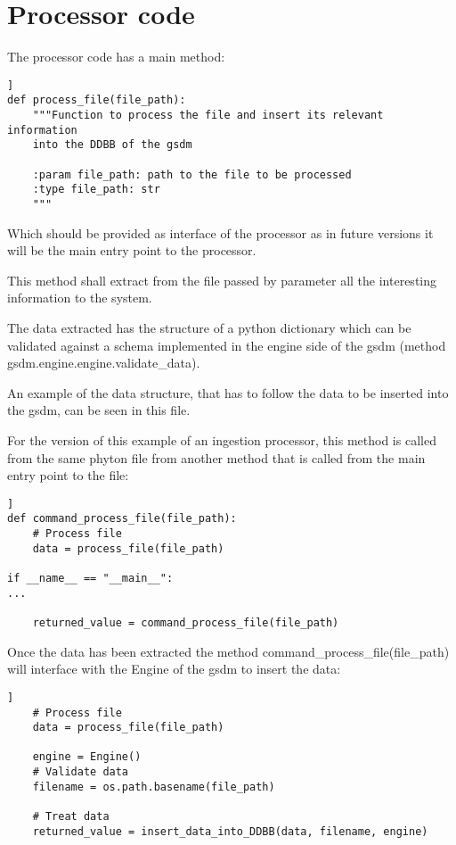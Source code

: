 \section{Processor code}

The processor code has a main method:

\begin{lstlisting}[breaklines=true, style=python]]
def process_file(file_path):
    """Function to process the file and insert its relevant information
    into the DDBB of the gsdm

    :param file_path: path to the file to be processed
    :type file_path: str
    """
\end{lstlisting}

Which should be provided as interface of the processor as in future versions it will be the main entry point to the processor.

This method shall extract from the file passed by parameter all the interesting information to the system.

The data extracted has the structure of a python dictionary which can be validated against a schema implemented in the engine side of the gsdm (method gsdm.engine.engine.validate\_data).

An example of the data structure, that has to follow the data to be inserted into the gsdm, can be seen in this file.

For the version of this example of an ingestion processor, this method is called from the same phyton file from another method that is called from the main entry point to the file:

\begin{lstlisting}[breaklines=true, style=python]]
def command_process_file(file_path):
    # Process file
    data = process_file(file_path)

if __name__ == "__main__":
...

    returned_value = command_process_file(file_path)
\end{lstlisting}

Once the data has been extracted the method command\_process\_file(file\_path) will interface with the Engine of the gsdm to insert the data:

\begin{lstlisting}[breaklines=true, style=python]]
    # Process file
    data = process_file(file_path)

    engine = Engine()
    # Validate data
    filename = os.path.basename(file_path)

    # Treat data
    returned_value = insert_data_into_DDBB(data, filename, engine)
\end{lstlisting}

